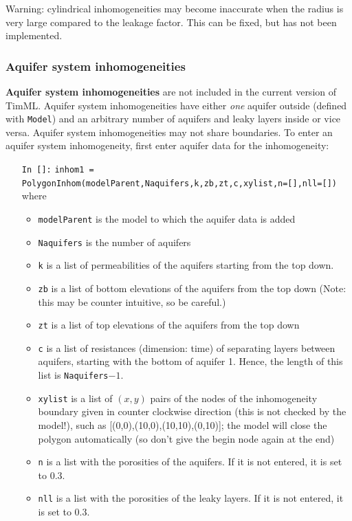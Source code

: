 \documentclass [10pt,letterpaper] {article}
\begin{document}
Warning: cylindrical inhomogeneities may become inaccurate when the radius is very large
compared to the leakage factor. This can be fixed, but has not been
implemented.

\subsubsection{Aquifer system inhomogeneities}
{\bf Aquifer system inhomogeneities} are not included in the current version of TimML.
Aquifer system inhomogeneities have either \emph{one} aquifer
outside (defined with {\tt Model}) and an arbitrary number of aquifers and
leaky layers inside or vice versa. Aquifer system inhomogeneities may
not share boundaries. To enter an aquifer system inhomogeneity, first enter aquifer data for the inhomogeneity:
\begin{itemize}
\item[{\tt In []:}] {\tt inhom1 = PolygonInhom(modelParent,Naquifers,k,zb,zt,c,xylist,n=[],nll=[])} where
    \begin{itemize}
    \item {\tt modelParent} is the model to which the aquifer data is
    added
    \item {\tt Naquifers} is the number of aquifers
    \item {\tt k} is a list of permeabilities of the aquifers starting
    from the top down.
    \item {\tt zb} is a list of bottom elevations of the aquifers
    from the top down (Note: this may be counter intuitive, so be
    careful.)
    \item {\tt zt} is a list of top elevations of the aquifers
    from the top down
    \item {\tt c} is a list of resistances (dimension: time) of separating layers
    between aquifers, starting with the bottom of aquifer 1. Hence, the
    length of this list is {\tt Naquifers}$-1$.
    \item {\tt xylist} is a list of $(x,y)$ pairs of the nodes of
    the inhomogeneity boundary given in counter clockwise
    direction (this is not checked by the model!), such as
    [(0,0),(10,0),(10,10),(0,10)]; the model will close the
    polygon automatically (so don't give the begin node again at
    the end)
    \item {\tt n} is a list with the porosities of the aquifers. If it is not entered, it is set to 0.3.
    \item {\tt nll} is a list with the porosities of the leaky layers. If it is not entered, it is set to 0.3.
    \end{itemize}
\end{itemize}
\end{document}
